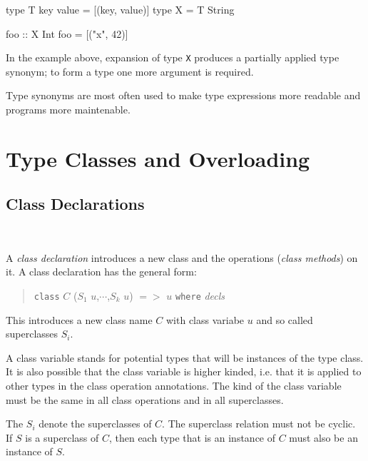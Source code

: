 \begin{code}
type T key value = [(key, value)]
type X = T String

foo :: X Int
foo = [("x", 42)]
\end{code}

In the example above, expansion of type \texttt{X} produces a partially applied type synonym; to form a type one more argument is required.

Type synonyms are most often used to make type expressions more readable and programs more maintenable.

\section{Type Classes and Overloading}
\subsection{Class Declarations} \label{classdcl}  

\begin{flushleft}
     \\
  
\end{flushleft}

A \emph{class declaration} introduces a new class and the operations (\emph{class methods}) on it. A class declaration has the general form:

\begin{quote}
\texttt{class} $C$ \hspace{0.2cm} ($S_1$ $u$,$\cdots$,$S_k$ $u$)  $=>$ $u$\hspace{0.2cm} \texttt{where} \hspace{0.2cm} \emph{decls}
\end{quote}

This introduces a new class name $C$ with class variabe $u$ and so called superclasses $S_i$.

A class variable stands for potential types that will be instances of the type class. It is also possible that the class variable is higher kinded, i.e. that it is applied to other types in the class operation annotations. The kind of the class variable must be the same in all class operations and in all superclasses.

The $S_i$ denote the superclasses of $C$.
The superclass relation must not be cyclic. If $S$ is a superclass of $C$, then each type that is an instance of $C$ must also be an instance of $S$.

